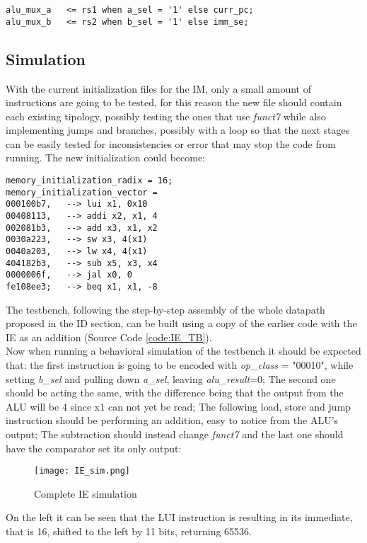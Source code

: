 \begin{verbatim}
alu_mux_a   <= rs1 when a_sel = '1' else curr_pc;
alu_mux_b   <= rs2 when b_sel = '1' else imm_se;
\end{verbatim}

\subsection{Simulation}
With the current initialization files for the IM, only a small amount of instructions are going to be tested, for this reason the new file should contain each existing tipology, possibly testing the ones that use \emph{funct7} while also implementing jumps and branches, possibly with a loop so that the next stages can be easily tested for inconsistencies or error that may stop the code from running.
The new initialization could become:

\begin{verbatim}
memory_initialization_radix = 16;
memory_initialization_vector =
000100b7,   --> lui x1, 0x10
00408113,   --> addi x2, x1, 4
002081b3,   --> add x3, x1, x2
0030a223,   --> sw x3, 4(x1)
0040a203,   --> lw x4, 4(x1)
404182b3,   --> sub x5, x3, x4
0000006f,   --> jal x0, 0 
fe108ee3;   --> beq x1, x1, -8
\end{verbatim}

The testbench, following the step-by-step assembly of the whole datapath proposed in the ID section, can be built using a copy of the earlier code with the IE as an addition (Source Code \ref{code:IE_TB}).\\
Now when running a behavioral simulation of the testbench it should be expected that: the first instruction is going to be encoded with \emph{op{\_}class} = "00010", while setting \emph{b{\_}sel} and pulling down \emph{a{\_}sel}, leaving \emph{alu{\_}result}=0; The second one should be acting the same, with the difference being that the output from the ALU will be 4 since x1 can not yet be read; The following load, store and jump instruction should be performing an addition, easy to notice from the ALU's output; The subtraction should instead change \emph{funct7} and the last one should have the comparator set its only output:

\begin{figure}[ht]
    \centering
    \texttt{[image: IE\_sim.png]}
    \caption{Complete IE simulation}
    \label{fig:IE_sim}
\end{figure}

On the left it can be seen that the LUI instruction is resulting in its immediate, that is 16, shifted to the left by 11 bits, returning 65536.

